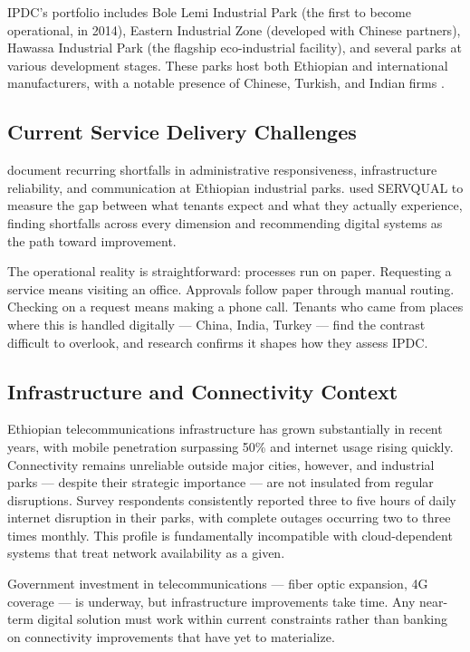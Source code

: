 IPDC's portfolio includes Bole Lemi Industrial Park (the first to become operational, in 2014), Eastern Industrial Zone (developed with Chinese partners), Hawassa Industrial Park (the flagship eco-industrial facility), and several parks at various development stages. These parks host both Ethiopian and international manufacturers, with a notable presence of Chinese, Turkish, and Indian firms \citep{Tesfaw2023}.

\subsection{Current Service Delivery Challenges}

\citet{Guteta2022} document recurring shortfalls in administrative responsiveness, infrastructure reliability, and communication at Ethiopian industrial parks. \citet{Guteta2023} used SERVQUAL to measure the gap between what tenants expect and what they actually experience, finding shortfalls across every dimension and recommending digital systems as the path toward improvement.

The operational reality is straightforward: processes run on paper. Requesting a service means visiting an office. Approvals follow paper through manual routing. Checking on a request means making a phone call. Tenants who came from places where this is handled digitally --- China, India, Turkey --- find the contrast difficult to overlook, and research confirms it shapes how they assess IPDC.

\subsection{Infrastructure and Connectivity Context}

Ethiopian telecommunications infrastructure has grown substantially in recent years, with mobile penetration surpassing 50\% and internet usage rising quickly. Connectivity remains unreliable outside major cities, however, and industrial parks --- despite their strategic importance --- are not insulated from regular disruptions. Survey respondents consistently reported three to five hours of daily internet disruption in their parks, with complete outages occurring two to three times monthly. This profile is fundamentally incompatible with cloud-dependent systems that treat network availability as a given.

Government investment in telecommunications --- fiber optic expansion, 4G coverage --- is underway, but infrastructure improvements take time. Any near-term digital solution must work within current constraints rather than banking on connectivity improvements that have yet to materialize.

